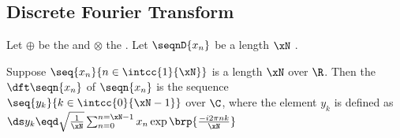 \subsection{Discrete Fourier Transform}
\begin{definition}
\label{def:dft}
\label{def:dftR}
Let $\oplus$ be the  
and $\otimes$   the  .
Let $\seqnD{x_n}$ be a length $\xN$  .
\end{definition}

\begin{example}
Suppose $\seq{x_n}{n\in\intcc{1}{\xN}}$ is a length $\xN$  over $\R$.
Then the  $\dft\seqn{x_n}$ of $\seqn{x_n}$ is the sequence
$\seq{y_k}{k\in\intcc{0}{\xN-1}}$ over $\C$, where the element $y_k$ is defined as
\\\indentx
  $\ds y_k \eqd \sqrt{\frac{1}{\xN}}\sum_{n=0}^{n=\xN-1} x_n \exp\brp{\frac{-i2\pi nk}{\xN}}$
\end{example}

